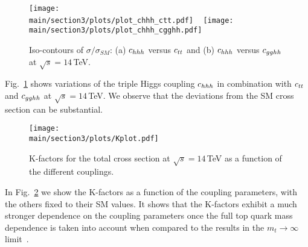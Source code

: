 %
\begin{figure}[ht]
\begin{center}
\texttt{[image: \\main/section3/plots/plot\_chhh\_ctt.pdf]}    
~
\texttt{[image: \\main/section3/plots/plot\_chhh\_cgghh.pdf]}
\end{center}
\caption{Iso-contours of $\sigma/\sigma_{SM}$: (a) $c_{hhh}$ versus $c_{tt}$ and (b) $c_{hhh}$ versus $c_{gghh}$  at $\sqrt{s}=14$\,TeV.}
\label{fig:chhh_ctt_cgg}
\end{figure}

Fig.~\ref{fig:chhh_ctt_cgg} shows variations of the triple Higgs coupling $c_{hhh}$ in combination with $c_{tt}$ and $c_{gghh}$ at $\sqrt{s}=14$\,TeV.
We observe that the deviations from the SM cross section can be substantial.
%
\begin{figure}[ht]
\begin{center}
\texttt{[image: \\main/section3/plots/Kplot.pdf]}
\end{center}
\caption{K-factors for the total cross section at $\sqrt{s}=14$\,TeV as a function of the
  different couplings.}
\label{fig:project_ctt}
\end{figure}
%
In Fig.~\ref{fig:project_ctt} we show the K-factors as a function of
the coupling parameters, with the others fixed to their SM values. 
It shows that the K-factors exhibit a much stronger dependence on the
coupling parameters once the full top quark mass dependence is taken into account when compared to 
the results in the $m_t\to\infty$ limit~\cite{Grober:2015cwa,deFlorian:2017qfk}.
%

